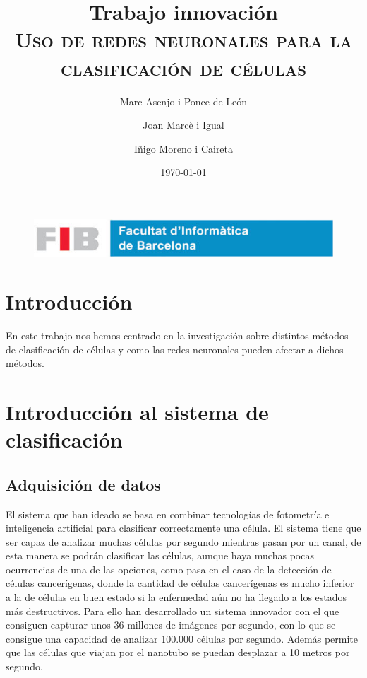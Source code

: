 \documentclass[a4paper, 12pt, UTF8]{article}
\title{
	\Huge
	\textbf{Trabajo innovación} \\
	\scshape Uso de redes neuronales para la clasificación de células
	}
\author{
	Marc Asenjo i Ponce de León \and
	Joan Marcè i Igual \and
	Iñigo Moreno i Caireta
	}
\date{\today}
\begin{document}
\maketitle

\begin{figure}
	\centering
	\includegraphics[width=\linewidth]{./simple_FIB}
\end{figure}

\newpage
\tableofcontents

\newpage

\section{Introducción}

En este trabajo nos hemos centrado en la investigación\cite{deepLearning} sobre distintos métodos de clasificación de células y como las redes neuronales pueden afectar a dichos métodos.

\section{Introducción al sistema de clasificación}

\subsection{Adquisición de datos}
El sistema que han ideado se basa en combinar tecnologías de fotometría e inteligencia artificial para clasificar correctamente una célula. El sistema tiene que ser capaz de analizar muchas células por segundo mientras pasan por un canal, de esta manera se podrán clasificar las células, aunque haya muchas pocas ocurrencias de una de las opciones, como pasa en el caso de la detección de células cancerígenas, donde la cantidad de células cancerígenas es mucho inferior a la de células en buen estado si la enfermedad aún no ha llegado a los estados más destructivos. Para ello han desarrollado un sistema innovador con el que consiguen capturar unos 36 millones de imágenes por segundo, con lo que se consigue una capacidad de analizar 100.000 células por segundo. Además permite que las células que viajan por el nanotubo se puedan desplazar a 10 metros por segundo.
\end{document}
